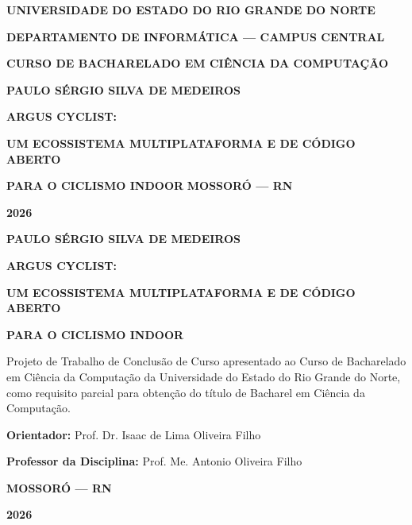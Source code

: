 \documentclass[
    a4paper,
    12pt,
    oneside,
    english,
    brazil,
    chapter=TITLE,
    section=TITLE,
]{abntex2}
\begin{document}
\renewcommand{\imprimircapa}{%
  \begin{capa}
    \center
    \textbf{\large UNIVERSIDADE DO ESTADO DO RIO GRANDE DO NORTE}
    \par
    \textbf{DEPARTAMENTO DE INFORMÁTICA --- CAMPUS CENTRAL}
    \par
    \textbf{CURSO DE BACHARELADO EM CIÊNCIA DA COMPUTAÇÃO}
    \par
    \vspace{1.5cm}
    \textbf{\large PAULO SÉRGIO SILVA DE MEDEIROS}
    \vspace{4cm}
    \par
    \textbf{\Large ARGUS CYCLIST:}
    \par
    \textbf{\Large UM ECOSSISTEMA MULTIPLATAFORMA E DE CÓDIGO ABERTO}
    \par
    \textbf{\Large PARA O CICLISMO INDOOR}
    \vfill
    \textbf{MOSSORÓ --- RN}
    \par
    \textbf{2026}
  \end{capa}
}
\imprimircapa

\begin{folhaderosto}
  \begin{center}
    \textbf{\large PAULO SÉRGIO SILVA DE MEDEIROS}
    \vspace{3.5cm}
    \par
    \textbf{\Large ARGUS CYCLIST:}
    \par
    \textbf{\Large UM ECOSSISTEMA MULTIPLATAFORMA E DE CÓDIGO ABERTO}
    \par
    \textbf{\Large PARA O CICLISMO INDOOR}
    \vspace{1.5cm}
    \par
    \hfill
    \begin{minipage}{0.45\textwidth}
      \small
      Projeto de Trabalho de Conclusão de Curso apresentado ao Curso de Bacharelado em Ciência da Computação da Universidade do Estado do Rio Grande do Norte, como requisito parcial para obtenção do título de Bacharel em Ciência da Computação.
      \vspace{0.5cm}
      \par
      \textbf{Orientador:} Prof. Dr. Isaac de Lima Oliveira Filho
      \par
      \textbf{Professor da Disciplina:} Prof. Me. Antonio Oliveira Filho
    \end{minipage}
    \vfill
    \textbf{MOSSORÓ --- RN}
    \par
    \textbf{2026}
  \end{center}
\end{folhaderosto}
\end{document}
